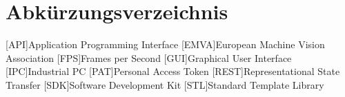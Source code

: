 \chapter*{Abkürzungsverzeichnis}

\begin{acronym}[\hspace{3cm}]

    [API]{Application Programming Interface}
    [EMVA]{European Machine Vision Association}
    [FPS]{Frames per Second}
    [GUI]{Graphical User Interface}
    [IPC]{Industrial PC}
    [PAT]{Personal Access Token}
    [REST]{Representational State Transfer}
    [SDK]{Software Development Kit}
    [STL]{Standard Template Library}

\end{acronym}